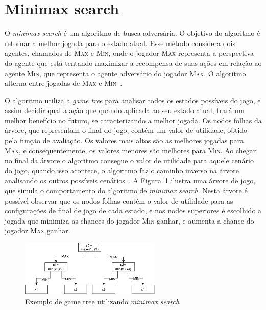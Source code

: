 \section{Minimax search}
\label{sec:minimax}

O \textit{minimax search} é um algoritmo de busca adversária. 
O objetivo do algoritmo é retornar a melhor jogada para o estado atual. 
Esse método considera dois agentes, chamados de \textsc{Max} e \textsc{Min}, onde o jogador \textsc{Max} representa a perspectiva do agente que está tentando maximizar a recompensa de suas ações em relação ao agente \textsc{Min}, que representa o agente adversário do jogador \textsc{Max}. 
O algoritmo alterna entre jogadas de \textsc{Max} e \textsc{Min}~\cite[Capítulo 5]{intelligence2003modern}. 

O algoritmo utiliza a \textit{game tree} para analisar todos os estados possíveis do jogo, e assim decidir qual a ação que quando aplicada ao seu estado atual, trará um melhor benefício no futuro, se caracterizando a melhor jogada. 
Os nodos folhas da árvore, que representam o final do jogo, contém um valor de utilidade, obtido pela função de avaliação. 
Os valores mais altos são as melhores jogadas para \textsc{Max}, e consequentemente, os valores menores são melhores para \textsc{Min}. 
Ao chegar no final da árvore o algoritmo consegue o valor de utilidade para aquele cenário do jogo, quando isso acontece, o algoritmo faz o caminho inverso na árvore analisando os outros possíveis cenários~\cite[Capítulo 5]{intelligence2003modern}. 
A Figura~\ref{fig:gametree} ilustra uma árvore de jogo, que simula o comportamento do algoritmo de \textit{minimax search}. Nesta árvore é possível observar que os nodos folhas contém o valor de utilidade para as configurações de final de jogo de cada estado, e nos nodos superiores é escolhido a jogada que minimiza as chances do jogador \textsc{Min} ganhar, e aumenta a chance do jogador \textsc{Max} ganhar.

\begin{figure}[ht]
	\centering
	\includegraphics[width=0.6\textwidth]{fig/gametree.pdf}
	\caption{Exemplo de game tree utilizando \textit{minimax search}}
	\label{fig:gametree}
\end{figure} 


